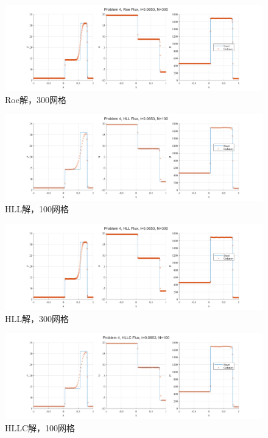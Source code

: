 \documentclass[UTF8,zihao=5]{ctexart} %
\begin{document}
\begin{figure}[H]
    \centering
    \includegraphics[width=18cm]{p4_Roe_N300.png}  %
    \caption{Roe解，300网格}
\end{figure}

\begin{figure}[H]
    \centering
    \includegraphics[width=18cm]{p4_HLL_N100.png}  %
    \caption{HLL解，100网格}
\end{figure}

\begin{figure}[H]
    \centering
    \includegraphics[width=18cm]{p4_HLL_N300.png}  %
    \caption{HLL解，300网格}
\end{figure}

\begin{figure}[H]
    \centering
    \includegraphics[width=18cm]{p4_HLLC_N100.png}  %
    \caption{HLLC解，100网格}
\end{figure}
\end{document}

